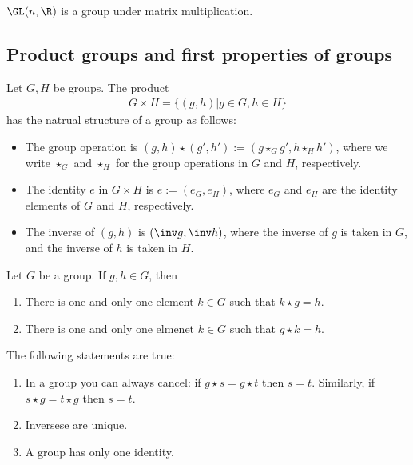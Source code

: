 \documentclass{article}
\begin{document}
\begin{theorem}
    $\GL(n,\R)$ is a group under matrix multiplication.
\end{theorem}

\subsection{Product groups and first properties of groups}

\begin{theorem}
    Let $G,H$ be groups. The product
    \begin{align*}
        G\times H=\{(g,h)|g\in G, h\in H\}
    \end{align*}
    has the natrual structure of a group as follows:
    \begin{itemize}
        \item The group operation is $(g,h)\star(g',h'):=(g\star_G g', h\star_H h')$, 
        where we write $\star_G$ and $\star_H$ for the group operations in $G$ and $H$, respectively.
        \item The identity $e$ in $G\times H$ is $e:=(e_G, e_H)$, where $e_G$ and 
        $e_H$ are the identity elements of $G$ and $H$, respectively.
        \item The inverse of $(g,h)$ is $(\inv g, \inv h)$, where the inverse of $g$ is taken in $G$,
        and the inverse of $h$ is taken in $H$.
    \end{itemize}
\end{theorem}

\setcounter{theorem}{5}
\begin{lemma}
    Let $G$ be a group. If $g,h\in G$, then
    \begin{enumerate}
        \item There is one and only one element $k\in G$ such that $k\star g=h$.
        \item There is one and only one elmenet $k\in G$ such that $g\star k=h$.
    \end{enumerate}
\end{lemma}

\setcounter{theorem}{7}
\begin{corollary}
    The following statements are true:
    \begin{enumerate}
        \item In a group you can always cancel: if $g\star s=g\star t$ 
        then $s=t$. Similarly, if $s\star g=t\star g$ then $s=t$.
        \item Inversese are unique.
        \item A group has only one identity.
    \end{enumerate}
\end{corollary}
\end{document}
